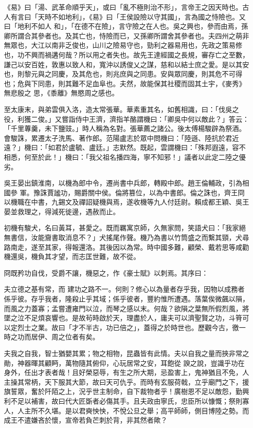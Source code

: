 \begin{pinyinscope}
 《易》曰「湯、武革命順乎天」，或曰「亂不極則治不形」，言帝王之因天時也。古人有言曰「天時不如地利」，《易》曰「王侯設險以守其國」，言為國之恃險也。又曰「地利不如人
 和」，「在德不在險」，言守險之在人也。吳之興也，參而由焉，孫卿所謂合其參者也。及其亡也，恃險而已，又孫卿所謂舍其參者也。夫四州之萌非無眾也，大江以南非乏俊也，山川之險易守也，勁利之器易用也，先政之策易修也，功不興而禍遘何哉？所以用之者失也。故先王達經國之長規，審存亡之至數，謙己以安百姓，敦惠以致人和，寬沖以誘俊乂之謀，慈和以結士庶之愛。是以其安也，則黎元與之同慶，及其危也，則兆庶與之同患。安與眾同慶，則其危不可得也；危與下同患，則其難不足血阜也。夫然，故能保其社稷而固其土宇，《麥秀》無悲殷之
 思，《黍離》無愍周之感也。



 至太康末，與弟雲俱入洛，造太常張華。華素重其名，如舊相識，曰：「伐吳之役，利獲二俊。」又嘗詣侍中王濟，濟指羊酪謂機曰：「卿吳中何以敵此？」答云：「千里蓴羹，未下鹽豉。」時人稱為名對。張華薦之諸公。後太傅楊駿辟為祭酒。會駿誅，累遷太子洗馬、著作郎。范陽盧志於眾中問機曰：「陸遜、陸抗於君近遠？」機曰：「如君於盧毓、盧廷。」志默然。既起，雲謂機曰：「殊邦遐遠，容不相悉，何至於此！」機曰：「我父祖名播四海，寧不知邪！」議者以此定二陸之優劣。



 吳王晏出鎮淮南，以機為郎中令，遷尚書中兵郎，轉殿中郎。趙王倫輔政，引為相國參
 軍。豫誅賈謐功，賜爵關中侯。倫將篡位，以為中書郎。倫之誅也，齊王冏以機職在中書，九錫文及禪詔疑機與焉，遂收機等九人付廷尉。賴成都王穎、吳王晏並救理之，得減死徙邊，遇赦而止。



 初機有駿犬，名曰黃耳，甚愛之。既而羈寓京師，久無家問，笑語犬曰：「我家絕無書信，汝能齎書取消息不？」犬搖尾作聲。機乃為書以竹筒盛之而繫其頸，犬尋路南走，遂至其家，得報還洛。其後因以為常。時中國多難，顧榮、戴若思等咸勸機還吳，機負其才望，而志匡世難，故不從。



 冏既矜功自伐，受爵不讓，機惡之，作《豪士賦》以刺焉。其序曰：



 夫立德之基有常，而
 建功之路不一。何則？修心以為量者存乎我，因物以成務者係乎彼。存乎我者，隆殺止乎其域；係乎彼者，豐約惟所遭遇。落葉俟微飆以隕，而風之力蓋寡；孟嘗遭雍門以泣，而琴之感以末。何哉？欲隕之葉無所假烈風，將墜之泣不足煩哀響也。是故茍時啟於天，理盡於人，庸夫可以濟聖賢之功，斗筲可以定烈士之業。故曰「才不半古，功已倍之」，蓋得之於時世也。歷觀今古，徼一時之功而居伊、周之位者有矣。



 夫我之自我，智士猶嬰其累；物之相物，昆蟲皆有此情。夫以自我之量而挾非常之勛，神器暉其顧眄，萬物隨其俯仰，心玩居常之安，耳飽從
 諛之說，豈識乎功在身外，任出才表者哉！且好榮惡辱，有生之所大期，忌盈害上，鬼神猶且不免，人主操其常柄，天下服其大節，故曰天可仇乎。而時有玄服荷戟，立乎廟門之下，援旗誓眾，奮於阡陌之上，況乎世主制命，自下裁物者乎！廣樹恩不足以敵怨，勤興利不足以補害，故曰代大匠斲者必傷其手。且夫政由寧氏，忠臣所以慷慨；祭則寡人，人主所不久堪。是以君奭怏怏，不悅公旦之舉；高平師師，側目博陸之勢。而成王不遣嫌吝於懷，宣帝若負芒刺於背，非其然者歟？




\end{pinyinscope}
